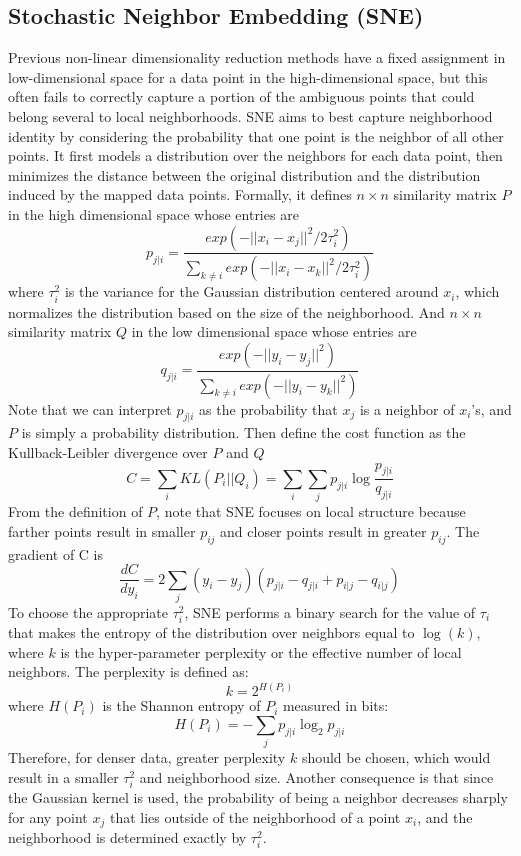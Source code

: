 \subsection{Stochastic Neighbor Embedding (SNE)}
Previous non-linear dimensionality reduction methods have a fixed
assignment in low-dimensional space for a data point in the
high-dimensional space, but this often fails to correctly capture a
portion of the ambiguous points that could belong several to local
neighborhoods. SNE aims to best capture neighborhood identity by
considering the probability that one point is the neighbor of all
other points. It first models a distribution over the neighbors for
each data point, then minimizes the distance between the original 
distribution and the distribution induced by the mapped data points.
Formally, it defines $n\times n$ similarity matrix $P$
in the high dimensional space whose entries are 
\[ p_{j\vert i} = \frac{exp(-\vert \vert x_i -x_j \vert \vert^2 /
  2\tau_i^2)}{\sum_{k\neq i} exp(-\vert \vert x_i -x_k \vert \vert^2 /
  2\tau_i^2)}\] where $\tau_i^2$ is the variance for the Gaussian distribution
  centered around $x_i$, which normalizes the distribution based on the size of
  the neighborhood. And $n\times n$ similarity matrix $Q$ in the low dimensional
  space whose entries are 
\[
q_{j\vert i} = \frac{exp(-\vert \vert y_i - y_j \vert
  \vert^2)}{\sum_{k\neq i} exp(-\vert \vert y_i -y_k \vert \vert^2)} 
\]
Note that we can interpret $p_{j\vert i}$ as the probability that
$x_j$ is a neighbor of $x_i$'s, and $P$ is simply a probability
distribution. Then define the cost function as the Kullback-Leibler
divergence over $P$ and $Q$ 
\[
C=\sum_i KL(P_i \vert \vert Q_i) = \sum_i \sum_j p_{j\vert i} \log
\frac{p_{j \vert i}}{q_{j \vert i}} 
\]
From the definition of $P$, note that SNE focuses on local structure
because farther points result in smaller $p_{ij}$ and closer points
result in greater $p_{ij}$. The gradient of C is 
\[\frac{dC}{dy_i}=2\sum_{j} (y_i-y_j)(p_{j|i}-q_{j|i}+p_{i|j}-q_{i|j}) \]
To choose the appropriate $\tau_i^2$, SNE performs a binary search for
the value of $\tau_i$ that makes the entropy of the distribution over
neighbors equal to $\log(k)$, where $k$ is the hyper-parameter
perplexity or the effective number of local neighbors. The perplexity
is defined as: 
\[
k=2^{H(P_i)}
\]
where $H(P_i)$ is the Shannon entropy of $P_i$ measured in bits:
\[
H(P_i)=-\sum_j p_{j \vert i} \log_2 p_{j \vert i}
\]
Therefore, for denser data, greater perplexity $k$ should be chosen,
which would result in a smaller $\tau_i^2$ and neighborhood
size. Another consequence is that since the Gaussian kernel is used,
the probability of being a neighbor decreases sharply for any point
$x_j$ that lies outside of the neighborhood of a point $x_i$, and the
neighborhood is determined exactly by $\tau_i^2$. 

